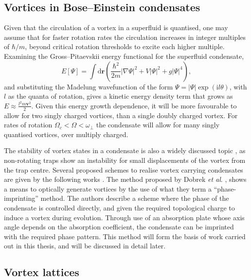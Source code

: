 \subsection{Vortices in Bose--Einstein condensates}\label{ss:vorticesinbec}

Given that the circulation of a vortex in a superfluid is quantised, one may assume that for faster rotation rates the circulation increases in integer multiples of $\hbar/m$, beyond critical rotation thresholds to excite each higher multiple. Examining the Gross--Pitaevskii energy functional for the superfluid condensate,
\begin{equation}
    E[\Psi] = \int \mathrm{d}\textbf{r} \left( \frac{\hbar^2}{2m}|\nabla \Psi|^2  + V|\Psi|^2 + g|\Psi|^4   \right),
\end{equation}
and substituting the Madelung wavefunction of the form $\Psi = |\Psi|\exp(\mathrm{i}l\theta)$, with $l$ as the quanta of rotation, gives a kinetic energy density term that grows as $E \approx \frac{l^2 m \mathbf{v}^2}{2}$. Given this energy growth dependence, it will be more favourable to allow for two singly charged vortices, than a single doubly charged vortex. For rates of rotation $\Omega_c < \Omega < \omega_\perp$ the condensate will allow for many singly quantised vortices, over multiply charged.




The stability of vortex states in a condensate is also a widely discussed topic \cite{Vtx:Fedichev_pra_1999,Vtx:Feder_prl_1999}, as non-rotating traps show an instability for small displacements of the vortex from the trap centre. Several proposed schemes to realise vortex carrying condensates are given by the following works \cite{Vtx:Anglin_prl_1999,Vtx:Davies_prl_1999,Vtx:Marshall_pra_1999,Vtx:Dobrek_pra_1999}. The method proposed by Dobrek \textit{et al}. \cite{Vtx:Dobrek_pra_1999}, shows a means to optically generate vortices by the use of what they term a ``phase-imprinting'' method. The authors describe a scheme where the phase of the condensate is controlled directly, and given the required topological charge to induce a vortex during evolution. Through use of an absorption plate whose axis angle depends on the absorption coefficient, the condensate can be imprinted with the required phase pattern. This method will form the basis of work carried out in this thesis, and will be discussed in detail later.


\subsection{Vortex lattices}

